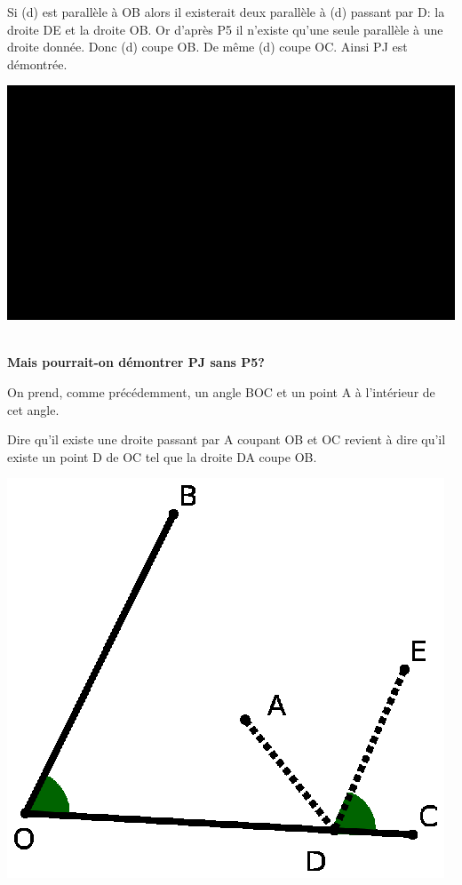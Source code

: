 \documentclass[a4paper, 12pt, twoside]{book}
\begin{document}
  Si (d) est parallèle à OB alors il existerait deux parallèle à (d) passant par D: la droite DE et la droite OB. Or d'après P5 il n'existe qu'une seule parallèle à une droite donnée. Donc (d) coupe OB. De même (d) coupe OC. Ainsi PJ est démontrée.
  

  
  \includegraphics[scale=0.8]{figures/JAHWA3.eps} \
 
 
  \textbf{ Mais pourrait-on démontrer PJ sans P5?}\
   
   On prend, comme précédemment, un angle BOC et un point A à l'intérieur de cet angle.\
   
   Dire qu'il existe une droite passant par A coupant OB et OC revient à dire qu'il existe un point D de OC tel que la droite DA coupe OB.\
   
    \includegraphics[scale=0.7]{figures/JAHWA4.eps} \
    
\end{document}
